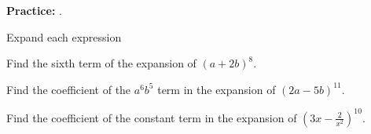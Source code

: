 \documentclass[addpoints]{exam}
\begin{document}
\noindent\textbf{Practice:} .
\begin{questions}
    \question Expand each expression
    



\newpage

    \question Find the sixth term of the expansion of $(a+2b)^8$.


    \question Find the coefficient of the $a^6b^5$ term in the expansion of $(2a-5b)^11$.


    \question Find the coefficient of the constant term in the expansion of $\left(3x - \frac{2}{x^2}\right)^{10}$.


\end{questions}
\end{document}
